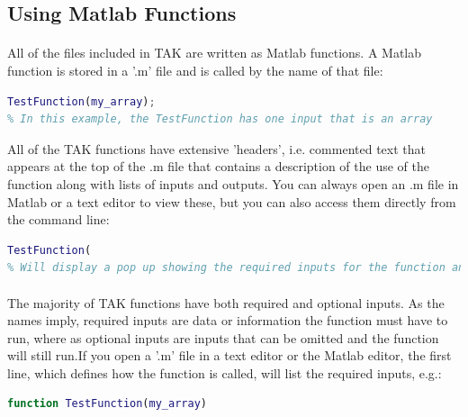 \subsection{Using Matlab Functions} \label{sec:funcPrimer}
\paragraph{}All of the files included in TAK are written as Matlab functions. A Matlab function is stored in a '.m' file and is called by the name of that file:

\begin{lstlisting}[language=Matlab]
% For a function file named TestFunction.m, you would call it like this at the command prompt in Matlab
TestFunction(my_array);
% In this example, the TestFunction has one input that is an array
\end{lstlisting}

\noindent
All of the TAK functions have extensive 'headers', i.e. commented text that appears at the top of the .m file that contains a description of the use of the function along with lists of inputs and outputs. You can always open an .m file in Matlab or a text editor to view these, but you can also access them directly from the command line:

\begin{lstlisting}[language=Matlab]
% Starting the call for a function like this
TestFunction(
% Will display a pop up showing the required inputs for the function and inclue a link labeled 'More Help...' that if clicked will open the header information for the function in a new window.
\end{lstlisting}

\paragraph{}The majority of TAK functions have both required and optional inputs. As the names imply, required inputs are data or information the function must have to run, where as optional inputs are inputs that can be omitted and the function will still run.If you open a '.m' file in a text editor or the Matlab editor, the first line, which defines how the function is called, will list the required inputs, e.g.:

\begin{lstlisting}[language=Matlab]
% A function definition with one required input
function TestFunction(my_array)
\end{lstlisting}

